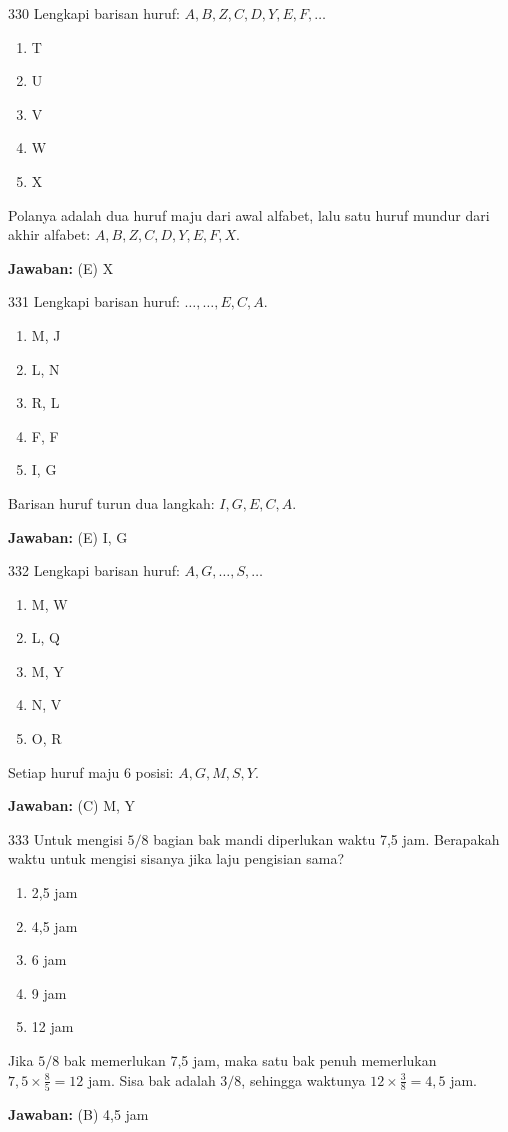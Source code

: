 \documentclass[11pt]{article}
\newenvironment{pil}{\begin{enumerate}[label=(\Alph*),leftmargin=*,itemsep=1pt,topsep=3pt]}{\end{enumerate}}
\newcommand{\jw}[1]{\par\smallskip\begin{jawbox}\textbf{Jawaban:} #1\end{jawbox}}
\begin{document}
\begin{soalbox}{3}{30}
Lengkapi barisan huruf: $A, B, Z, C, D, Y, E, F, \ldots$
\begin{pil}\item T \item U \item V \item W \item X\end{pil}
\end{soalbox}
\begin{pembox}
Polanya adalah dua huruf maju dari awal alfabet, lalu satu huruf mundur dari akhir alfabet: $A, B, Z, C, D, Y, E, F, X$.
\jw{(E) X}
\end{pembox}

\begin{soalbox}{3}{31}
Lengkapi barisan huruf: $\ldots, \ldots, E, C, A$.
\begin{pil}\item M, J \item L, N \item R, L \item F, F \item I, G\end{pil}
\end{soalbox}
\begin{pembox}
Barisan huruf turun dua langkah: $I, G, E, C, A$.
\jw{(E) I, G}
\end{pembox}

\begin{soalbox}{3}{32}
Lengkapi barisan huruf: $A, G, \ldots, S, \ldots$
\begin{pil}\item M, W \item L, Q \item M, Y \item N, V \item O, R\end{pil}
\end{soalbox}
\begin{pembox}
Setiap huruf maju 6 posisi: $A, G, M, S, Y$.
\jw{(C) M, Y}
\end{pembox}

\begin{soalbox}{3}{33}
Untuk mengisi $5/8$ bagian bak mandi diperlukan waktu 7,5 jam. Berapakah waktu untuk mengisi sisanya jika laju pengisian sama?
\begin{pil}\item 2,5 jam \item 4,5 jam \item 6 jam \item 9 jam \item 12 jam\end{pil}
\end{soalbox}
\begin{pembox}
Jika $5/8$ bak memerlukan 7,5 jam, maka satu bak penuh memerlukan $7{,}5\times\frac{8}{5}=12$ jam. Sisa bak adalah $3/8$, sehingga waktunya $12\times\frac{3}{8}=4{,}5$ jam.
\jw{(B) 4,5 jam}
\end{pembox}
\end{document}
